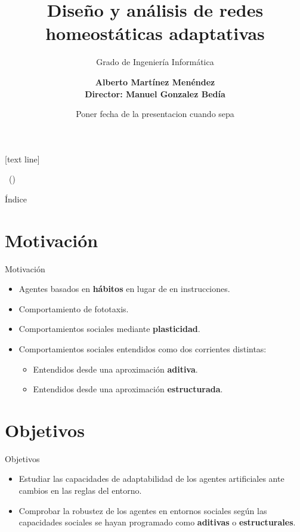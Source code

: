 \documentclass[aspectratio=169]{beamer}
\title{Diseño y análisis de redes homeostáticas adaptativas}
\subtitle{Grado de Ingeniería Informática}
\author[Alberto Martínez Menéndez]{\textbf {Alberto Martínez Menéndez\\ \footnotesize Director: Manuel Gonzalez Bedía}}
\institute{Escuela de Ingeniería y Arquitectura}
\date{Poner fecha de la presentacion cuando sepa}
\begin{document}
\begin{frame}
  \titlepage
\end{frame}

[text line]{%
  \parbox{0.8\linewidth}{
    \vspace*{-8pt}\insertshorttitle~(\insertshortauthor)
  }
  \hfill%
  \parbox{0.15\linewidth}{
    \vspace*{-8pt}\raggedleft\insertpagenumber
  }
}

\begin{frame}{Índice}
 \tableofcontents
\end{frame}

\section{Motivación}
\begin{frame}{Motivación}
\begin{itemize}
  \item {Agentes basados en \textbf{hábitos} en lugar de en instrucciones.}
  \item {Comportamiento de fototaxis.}
  \item {Comportamientos sociales mediante \textbf{plasticidad}.}
  \item {Comportamientos sociales entendidos como dos corrientes distintas:}
  \begin{itemize}
    \item {Entendidos desde una aproximación \textbf{aditiva}.}
    \item {Entendidos desde una aproximación \textbf{estructurada}.}
  \end{itemize}
\end{itemize}
\end{frame}

\section{Objetivos}
\begin{frame}{Objetivos}
  \begin{itemize}
  \item {Estudiar las capacidades de adaptabilidad de los agentes artificiales ante cambios en las reglas del entorno.}
  \item {Comprobar la robustez de los agentes en entornos sociales según las capacidades sociales se hayan programado como \textbf{aditivas} o \textbf{estructurales}.}
  \end{itemize}
\end{frame}
\end{document}
